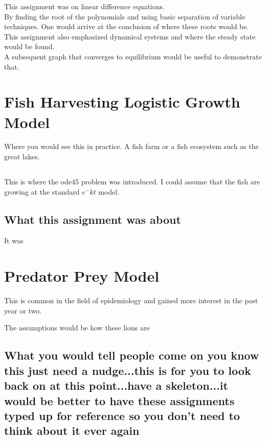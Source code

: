 This assignment was on linear difference equations. \\ 

By finding the root of the polynomials and using basic separation of variable techniques. One would arrive at the conclusion of where these roots would be. \\ 

This assignment also emphasized dynamical systems and where the steady state would be found. \\

A subsequent graph that converges to equilibrium would be useful to demonstrate that. 


\section{Fish Harvesting Logistic Growth Model}
Where you would see this in practice. A fish farm or a fish ecosystem such as the great lakes. \\  
\subsection{}
This is where the ode45 problem was introduced. 
I could assume that the fish are growing at the standard $e^-kt$ model.  

\subsection{What this assignment was about}

It was





\section{Predator Prey Model}

This is common in the field of epidemiology and gained more interest in the past year or two. 

The assumptions would be how these lions are 


\subsection{What you would tell people come on you know this just need a nudge...this is for you to look back on at this point...have a skeleton...it would be better to have these assignments typed up for reference so you don't need to think about it ever again}


